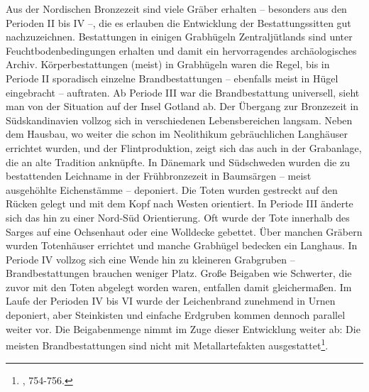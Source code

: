 \documentclass[openany,twoside,twocolumn]{book}
\let\rmarkdownfootnote\footnote%
\def\footnote{\protect\rmarkdownfootnote}
\begin{document}
Aus der Nordischen Bronzezeit sind viele Gräber erhalten -- besonders
aus den Perioden II bis IV --, die es erlauben die Entwicklung der
Bestattungssitten gut nachzuzeichnen. Bestattungen in einigen Grabhügeln
Zentraljütlands sind unter Feuchtbodenbedingungen erhalten und damit ein
hervorragendes archäologisches Archiv. Körperbestattungen (meist) in
Grabhügeln waren die Regel, bis in Periode II sporadisch einzelne
Brandbestattungen -- ebenfalls meist in Hügel eingebracht -- auftraten.
Ab Periode III war die Brandbestattung universell, sieht man von der
Situation auf der Insel Gotland ab. Der Übergang zur Bronzezeit in
Südskandinavien vollzog sich in verschiedenen Lebensbereichen langsam.
Neben dem Hausbau, wo weiter die schon im Neolithikum gebräuchlichen
Langhäuser errichtet wurden, und der Flintproduktion, zeigt sich das
auch in der Grabanlage, die an alte Tradition anknüpfte. In Dänemark und
Südschweden wurden die zu bestattenden Leichname in der Frühbronzezeit
in Baumsärgen -- meist ausgehöhlte Eichenstämme -- deponiert. Die Toten
wurden gestreckt auf den Rücken gelegt und mit dem Kopf nach Westen
orientiert. In Periode III änderte sich das hin zu einer Nord-Süd
Orientierung. Oft wurde der Tote innerhalb des Sarges auf eine
Ochsenhaut oder eine Wolldecke gebettet. Über manchen Gräbern wurden
Totenhäuser errichtet und manche Grabhügel bedecken ein Langhaus. In
Periode IV vollzog sich eine Wende hin zu kleineren Grabgruben --
Brandbestattungen brauchen weniger Platz. Große Beigaben wie Schwerter,
die zuvor mit den Toten abgelegt worden waren, entfallen damit
gleichermaßen. Im Laufe der Perioden IV bis VI wurde der Leichenbrand
zunehmend in Urnen deponiert, aber Steinkisten und einfache Erdgruben
kommen dennoch parallel weiter vor. Die Beigabenmenge nimmt im Zuge
dieser Entwicklung weiter ab: Die meisten Brandbestattungen sind nicht
mit Metallartefakten ausgestattet\footnote{\textcite{thrane_scandinavia_2013},
  754-756.}.
\end{document}
